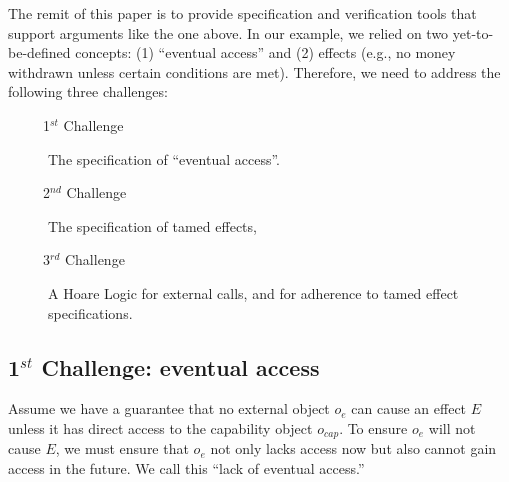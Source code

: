 \noindent
The remit of this paper is to provide specification and verification tools that support arguments like the one above. In our example, we relied on two yet-to-be-defined concepts: (1) ``eventual access'' and (2) \tamed effects (e.g., no money withdrawn unless certain conditions are met).
Therefore, we need to address the following three challenges: 
\begin{description}
\item[\ \ \ \ \  1$^{st}$ Challenge] The specification   of ``eventual  access''. 

\item[\ \ \ \ \   2$^{nd}$ Challenge] The specification of tamed effects, 

\item[\ \ \ \ \  3$^{rd}$ Challenge] A  Hoare Logic for external calls, and for adherence to tamed effect specifications.
\end{description}
%
 
 
\subsection{1$^{st}$ Challenge: eventual access} 


Assume we have a guarantee that no external object $o_e$ can cause an effect $E$ unless it has direct access to the capability object $o_{cap}$. To ensure $o_e$ will not cause $E$, we must ensure that $o_e$ not only lacks access now but also cannot gain access in the future.  We call this  ``lack of eventual access.''

